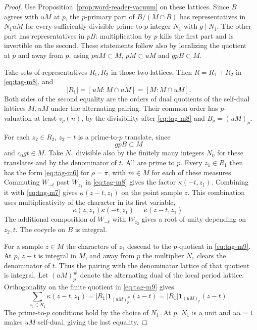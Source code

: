 \begin{proof}
Use Proposition~\ref{prop:word-reader-vacuum} on these lattices.
Since \(B\) agrees with \(uM\) at \(p\), the
\(p\)-primary part of \(B/(M\cap B)\) has representatives
in \(N_1uM\) for every sufficiently divisible
prime-to-\(p\) integer \(N_1\) with \(g\mid N_1\).
The other part has representatives in \(pB\):
multiplication by \(p\) kills the first part and is
invertible on the second. These statements follow
also by localizing the quotient at \(p\) and away from
\(p\), using \(p u M\subset M\),
\(pM\subset uM\) and \(gpB\subset M\).

Take sets of representatives \(R_1,R_2\) in those
two lattices. Then \(R=R_1+R_2\) in \eqref{eq:tag-m8}, and
\[
        |R_1|=[uM:M\cap uM]=[M:M\cap uM].
\tag{M9}\label{eq:tag-m9}
\]
Both sides of the second equality are the orders of
dual quotients of the self-dual lattices \(M,uM\)
under the alternating pairing. Their common order
has \(p\)-valuation at least \(v_p(n)\), by the
divisibility after \eqref{eq:tag-m8} and \(B_p=(uM)_p\).

For each \(z_2\in R_2\), \(z_2-t\) is a prime-to-\(p\)
translate, since 
\[
  gpB\subset M
\]
 and \(c_0gt\in M\).
Take \(N_1\) divisible also by the finitely many
integers \(N_0\) for these translates and by the
denominator of \(t\). All are prime to \(p\).
Every \(z_1\in R_1\) then has the form \eqref{eq:tag-m6}
for \(\rho=\bar\pi\), with \(m\in M\) for each
of these measures. Commuting \(W_{-t}\) past
\(W_{z_1}\) in \eqref{eq:tag-m8} gives the factor
\(\kappa(-t,z_1)\). Combining it with \eqref{eq:tag-m7}
gives \(\kappa(z-t,z_1)\) on the point sample \(z\).
This combination uses multiplicativity of the character in its first variable,
\[
  \kappa(z,z_1)\kappa(-t,z_1)=\kappa(z-t,z_1).
\]
The additional composition of \(W_{-t}\) with
\(W_{z_2}\) gives a root of unity depending on
\(z_2,t\). The cocycle on \(B\) is integral.

For a sample \(z\in M\) the characters of \(z_1\)
descend to the \(p\)-quotient in \eqref{eq:tag-m9}. At \(p\),
\(z-t\) is integral in \(M\), and away from \(p\)
the multiplier \(N_1\) clears the denominator
of \(t\). Thus the pairing with the denominator
lattice of that quotient is integral. Let \((uM)_p^\#\) denote the alternating dual of the local
period lattice. Orthogonality on the finite quotient in \eqref{eq:tag-m9}
gives
\[
 \sum_{z_1\in R_1}\kappa(z-t,z_1)
   = |R_1|\mathbf 1_{(uM)_p^\#}(z-t)
   = |R_1|\mathbf 1_{(uM)_p}(z-t).
\]
The prime-to-\(p\) conditions hold by the choice of \(N_1\).
At \(p\), \(N_1\) is a unit and \(u\bar u=1\) makes \(uM\)
self-dual, giving the last equality.


\end{proof}

